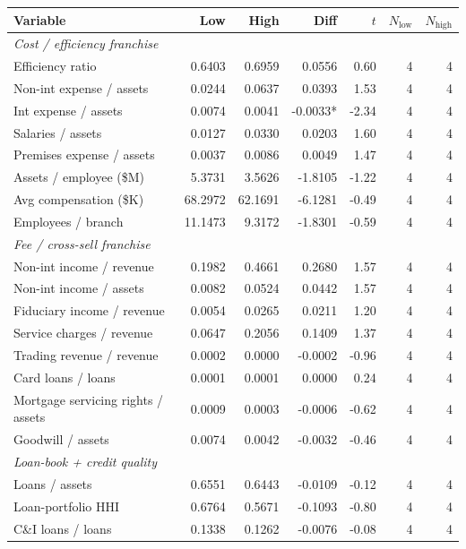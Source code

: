 \begin{tabular}{lrrrrrr}
\toprule
Variable & Low & High & Diff & $t$ & $N_{\text{low}}$ & $N_{\text{high}}$ \\
\midrule
\multicolumn{7}{l}{\emph{Cost / efficiency franchise}} \\
\midrule
Efficiency ratio & 0.6403 & 0.6959 & 0.0556 & 0.60 & 4 & 4 \\
Non-int expense / assets & 0.0244 & 0.0637 & 0.0393 & 1.53 & 4 & 4 \\
Int expense / assets & 0.0074 & 0.0041 & -0.0033* & -2.34 & 4 & 4 \\
Salaries / assets & 0.0127 & 0.0330 & 0.0203 & 1.60 & 4 & 4 \\
Premises expense / assets & 0.0037 & 0.0086 & 0.0049 & 1.47 & 4 & 4 \\
Assets / employee (\$M) & 5.3731 & 3.5626 & -1.8105 & -1.22 & 4 & 4 \\
Avg compensation (\$K) & 68.2972 & 62.1691 & -6.1281 & -0.49 & 4 & 4 \\
Employees / branch & 11.1473 & 9.3172 & -1.8301 & -0.59 & 4 & 4 \\
\midrule
\multicolumn{7}{l}{\emph{Fee / cross-sell franchise}} \\
\midrule
Non-int income / revenue & 0.1982 & 0.4661 & 0.2680 & 1.57 & 4 & 4 \\
Non-int income / assets & 0.0082 & 0.0524 & 0.0442 & 1.57 & 4 & 4 \\
Fiduciary income / revenue & 0.0054 & 0.0265 & 0.0211 & 1.20 & 4 & 4 \\
Service charges / revenue & 0.0647 & 0.2056 & 0.1409 & 1.37 & 4 & 4 \\
Trading revenue / revenue & 0.0002 & 0.0000 & -0.0002 & -0.96 & 4 & 4 \\
Card loans / loans & 0.0001 & 0.0001 & 0.0000 & 0.24 & 4 & 4 \\
Mortgage servicing rights / assets & 0.0009 & 0.0003 & -0.0006 & -0.62 & 4 & 4 \\
Goodwill / assets & 0.0074 & 0.0042 & -0.0032 & -0.46 & 4 & 4 \\
\midrule
\multicolumn{7}{l}{\emph{Loan-book + credit quality}} \\
\midrule
Loans / assets & 0.6551 & 0.6443 & -0.0109 & -0.12 & 4 & 4 \\
Loan-portfolio HHI & 0.6764 & 0.5671 & -0.1093 & -0.80 & 4 & 4 \\
C\&I loans / loans & 0.1338 & 0.1262 & -0.0076 & -0.08 & 4 & 4 \\

\end{tabular}
